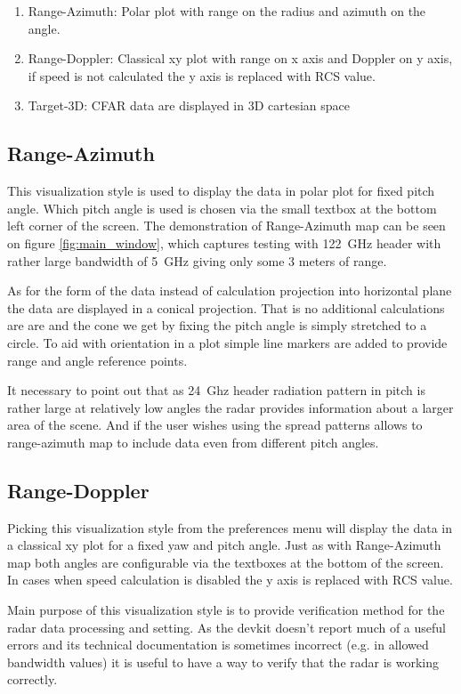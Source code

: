 \begin{enumerate}
	\item Range-Azimuth: Polar plot with range on the radius and azimuth on the angle.
	\item Range-Doppler: Classical xy plot with range on x axis and Doppler on y axis, if speed is not calculated the y axis is replaced with RCS value.
	\item Target-3D: CFAR data are displayed in 3D cartesian space
\end{enumerate}

\subsection{Range-Azimuth}

This visualization style is used to display the data in polar plot for fixed pitch angle.
Which pitch angle is used is chosen via the small textbox at the bottom left corner of the screen.
The demonstration of Range-Azimuth map can be seen on figure \ref{fig:main_window}, which captures testing with 122~GHz header with rather large bandwidth of 5~GHz giving only some 3 meters of range.

As for the form of the data instead of calculation projection into horizontal plane the data are displayed in a conical projection.
That is no additional calculations are are and the cone we get by fixing the pitch angle is simply stretched to a circle.
To aid with orientation in a plot simple line markers are added to provide range and angle reference points.

It necessary to point out that as 24~Ghz header radiation pattern in pitch is rather large at relatively low angles the radar provides information about a larger area of the scene.
And if the user wishes using the spread patterns allows to range-azimuth map to include data even from different pitch angles.

\subsection{Range-Doppler}

Picking this visualization style from the preferences menu will display the data in a classical xy plot for a fixed yaw and pitch angle.
Just as with Range-Azimuth map both angles are configurable via the textboxes at the bottom of the screen.
In cases when speed calculation is disabled the y axis is replaced with RCS value.

Main purpose of this visualization style is to provide verification method for the radar data processing and setting.
As the devkit doesn't report much of a useful errors and its technical documentation is sometimes incorrect (e.g. in allowed bandwidth values) it is useful to have a way to verify that the radar is working correctly.

